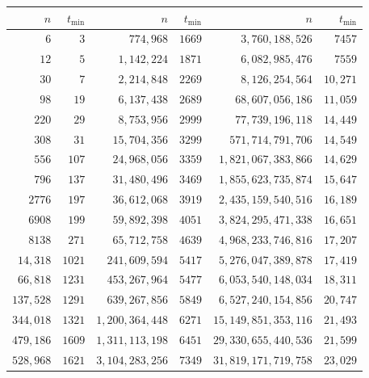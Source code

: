 \documentclass[10pt]{article}
\theoremstyle{definition}
\theoremstyle{remark}
\begin{document}
\begin{center}
\small
\setlength{\tabcolsep}{4pt}
\begin{tabular}{rrrrrr}
\toprule
$n$ & $t_{\min}$ & $n$ & $t_{\min}$ & $n$ & $t_{\min}$ \\
\midrule
$6$ & $3$ & $774{,}968$ & $1669$ & $3{,}760{,}188{,}526$ & $7457$ \\
$12$ & $5$ & $1{,}142{,}224$ & $1871$ & $6{,}082{,}985{,}476$ & $7559$ \\
$30$ & $7$ & $2{,}214{,}848$ & $2269$ & $8{,}126{,}254{,}564$ & $10{,}271$ \\
$98$ & $19$ & $6{,}137{,}438$ & $2689$ & $68{,}607{,}056{,}186$ & $11{,}059$ \\
$220$ & $29$ & $8{,}753{,}956$ & $2999$ & $77{,}739{,}196{,}118$ & $14{,}449$ \\
$308$ & $31$ & $15{,}704{,}356$ & $3299$ & $571{,}714{,}791{,}706$ & $14{,}549$ \\
$556$ & $107$ & $24{,}968{,}056$ & $3359$ & $1{,}821{,}067{,}383{,}866$ & $14{,}629$ \\
$796$ & $137$ & $31{,}480{,}496$ & $3469$ & $1{,}855{,}623{,}735{,}874$ & $15{,}647$ \\
$2776$ & $197$ & $36{,}612{,}068$ & $3919$ & $2{,}435{,}159{,}540{,}516$ & $16{,}189$ \\
$6908$ & $199$ & $59{,}892{,}398$ & $4051$ & $3{,}824{,}295{,}471{,}338$ & $16{,}651$ \\
$8138$ & $271$ & $65{,}712{,}758$ & $4639$ & $4{,}968{,}233{,}746{,}816$ & $17{,}207$ \\
$14{,}318$ & $1021$ & $241{,}609{,}594$ & $5417$ & $5{,}276{,}047{,}389{,}878$ & $17{,}419$ \\
$66{,}818$ & $1231$ & $453{,}267{,}964$ & $5477$ & $6{,}053{,}540{,}148{,}034$ & $18{,}311$ \\
$137{,}528$ & $1291$ & $639{,}267{,}856$ & $5849$ & $6{,}527{,}240{,}154{,}856$ & $20{,}747$ \\
$344{,}018$ & $1321$ & $1{,}200{,}364{,}448$ & $6271$ & $15{,}149{,}851{,}353{,}116$ & $21{,}493$ \\
$479{,}186$ & $1609$ & $1{,}311{,}113{,}198$ & $6451$ & $29{,}330{,}655{,}440{,}536$ & $21{,}599$ \\
$528{,}968$ & $1621$ & $3{,}104{,}283{,}256$ & $7349$ & $31{,}819{,}171{,}719{,}758$ & $23{,}029$ \\
\bottomrule
\end{tabular}
\end{center}
\end{document}
